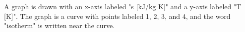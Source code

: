 A graph is drawn with an x-axis labeled "s [kJ/kg K]" and a y-axis labeled "T [K]". The graph is a curve with points labeled 1, 2, 3, and 4, and the word "isotherm" is written near the curve.